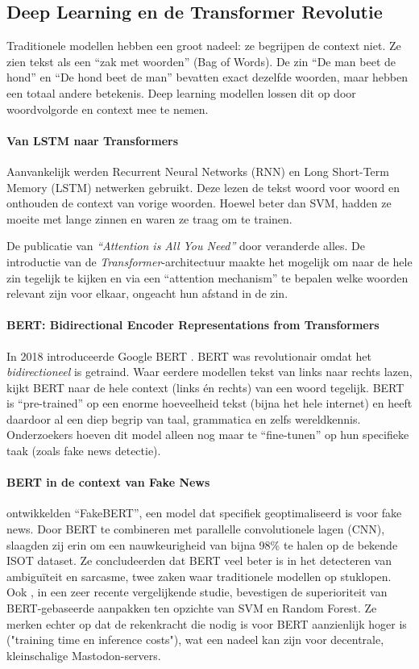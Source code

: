 \subsection{Deep Learning en de Transformer Revolutie}
Traditionele modellen hebben een groot nadeel: ze begrijpen de context niet. Ze zien tekst als een ``zak met woorden'' (Bag of Words). De zin ``De man beet de hond'' en ``De hond beet de man'' bevatten exact dezelfde woorden, maar hebben een totaal andere betekenis. Deep learning modellen lossen dit op door woordvolgorde en context mee te nemen.

\paragraph{Van LSTM naar Transformers}
Aanvankelijk werden Recurrent Neural Networks (RNN) en Long Short-Term Memory (LSTM) netwerken gebruikt. Deze lezen de tekst woord voor woord en onthouden de context van vorige woorden. Hoewel beter dan SVM, hadden ze moeite met lange zinnen en waren ze traag om te trainen.

De publicatie van \textit{``Attention is All You Need''} door \textcite{ashish2017attention} veranderde alles. De introductie van de \textit{Transformer}-architectuur maakte het mogelijk om naar de hele zin tegelijk te kijken en via een ``attention mechanism'' te bepalen welke woorden relevant zijn voor elkaar, ongeacht hun afstand in de zin.

\paragraph{BERT: Bidirectional Encoder Representations from Transformers}
In 2018 introduceerde Google BERT \autocite{Devlin2019}. BERT was revolutionair omdat het \textit{bidirectioneel} is getraind. Waar eerdere modellen tekst van links naar rechts lazen, kijkt BERT naar de hele context (links én rechts) van een woord tegelijk.
BERT is ``pre-trained'' op een enorme hoeveelheid tekst (bijna het hele internet) en heeft daardoor al een diep begrip van taal, grammatica en zelfs wereldkennis. Onderzoekers hoeven dit model alleen nog maar te ``fine-tunen'' op hun specifieke taak (zoals fake news detectie).

\paragraph{BERT in de context van Fake News}
\textcite{kaliyar2021fakebert} ontwikkelden ``FakeBERT'', een model dat specifiek geoptimaliseerd is voor fake news. Door BERT te combineren met parallelle convolutionele lagen (CNN), slaagden zij erin om een nauwkeurigheid van bijna 98\% te halen op de bekende ISOT dataset. Ze concludeerden dat BERT veel beter is in het detecteren van ambiguïteit en sarcasme, twee zaken waar traditionele modellen op stuklopen.
Ook \textcite{Khatri2025}, in een zeer recente vergelijkende studie, bevestigen de superioriteit van BERT-gebaseerde aanpakken ten opzichte van SVM en Random Forest. Ze merken echter op dat de rekenkracht die nodig is voor BERT aanzienlijk hoger is ("training time en inference costs"), wat een nadeel kan zijn voor decentrale, kleinschalige Mastodon-servers.

